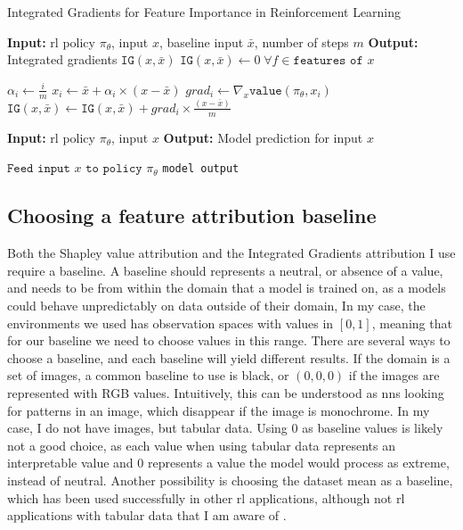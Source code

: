 \documentclass[UKenglish]{uiomasterthesis}
\begin{document}
\begin{algorithm}
\caption{Integrated Gradients for Feature Importance in Reinforcement Learning}
\label{alg:intgrad}
\begin{algorithmic}
    \State \textbf{Input:} \ac{rl} policy $\pi_\theta$, input $x$, baseline input $\bar{x}$, number of steps $m$
    \State \textbf{Output:} Integrated gradients $\texttt{IG}(x, \bar{x})$
    \State $\texttt{IG}(x, \bar{x}) \gets 0 \; \forall f \in \texttt{features of } x$ 
    
        \State $\alpha_i \gets \frac{i}{m}$
        \State $x_i \gets \bar{x} + \alpha_i \times (x - \bar{x})$
        \State $grad_i \gets \nabla_x \texttt{value}(\pi_\theta, x_i)$ 
        \State $\texttt{IG}(x, \bar{x}) \gets \texttt{IG}(x, \bar{x}) + grad_i \times \frac{(x - \bar{x})}{m}$
    \EndFor
    
        \State \textbf{Input:} \ac{rl} policy $\pi_\theta$, input $x$
        \State \textbf{Output:} Model prediction for input $x$
        
        \State $\texttt{Feed input } x \texttt{ to policy } \pi_\theta$
        \State \Return \texttt{model output}
    \EndFunction
\end{algorithmic}
\end{algorithm}


\subsection{Choosing a feature attribution baseline}
Both the Shapley value attribution and the Integrated Gradients attribution I use require a baseline. A baseline should represents a neutral, or absence of a value, and needs to be from within the domain that a model is trained on, as a models could behave unpredictably on data outside of their domain, In my case, the environments we used has observation spaces with values in $[0,1]$, meaning that for our baseline we need to choose values in this range. There are several ways to choose a baseline, and each baseline will yield different results. If the domain is a set of images, a common baseline to use is black, or $(0,0,0)$ if the images are represented with RGB values\cite{baseline_bird}. Intuitively, this can be understood as \acp{nn} looking for patterns in an image, which disappear if the image is monochrome.
In my case, I do not have images, but tabular data. Using $0$ as baseline values is likely not a good choice, as each value when using tabular data represents an interpretable value and $0$ represents a value the model would process as extreme, instead of neutral. Another possibility is choosing the dataset mean as a baseline, which has been used successfully in other \ac{rl} applications, although not \ac{rl} applications with tabular data that I am aware of \cite{baseline_rl}.
\end{document}
